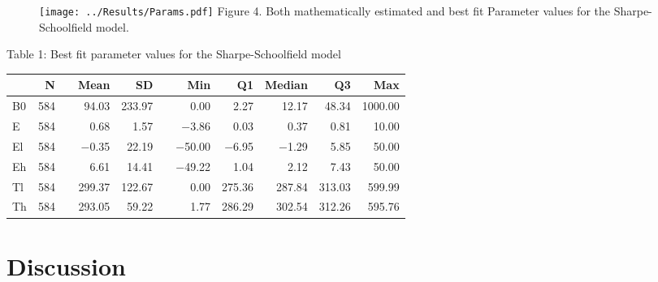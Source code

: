 \documentclass[12pt]{article}\usepackage[]{graphicx}\usepackage[]{color}
\begin{document}
  \begin{figure}[]
    \texttt{[image: ../Results/Params.pdf]}
    Figure 4. Both mathematically estimated and best fit Parameter values for the Sharpe-Schoolfield model.
  \end{figure}

  \begin{table}
    Table 1: Best fit parameter values for the Sharpe-Schoolfield model
\begin{center}
\begin{longtable}{lrrrrrrrrrr}
  \toprule
   & N &   & Mean & SD &   & Min & Q1 & Median & Q3 & Max \\ 
    \cmidrule{2-2}  \cmidrule{4-5} \cmidrule{7-11}
 \endhead
B0 & 584 &  & 94.03 & 233.97 &  & 0.00 & 2.27 & 12.17 & 48.34 & 1000.00 \\ 
  E & 584 &  & 0.68 & 1.57 &  & $-$3.86 & 0.03 & 0.37 & 0.81 & 10.00 \\ 
  El & 584 &  & $-$0.35 & 22.19 &  & $-$50.00 & $-$6.95 & $-$1.29 & 5.85 & 50.00 \\ 
  Eh & 584 &  & 6.61 & 14.41 &  & $-$49.22 & 1.04 & 2.12 & 7.43 & 50.00 \\ 
  Tl & 584 &  & 299.37 & 122.67 &  & 0.00 & 275.36 & 287.84 & 313.03 & 599.99 \\ 
  Th & 584 &  & 293.05 & 59.22 &  & 1.77 & 286.29 & 302.54 & 312.26 & 595.76 \\ 
   \bottomrule
\end{longtable}
\end{center}

  \end{table}


  \section{Discussion}
\end{document}
